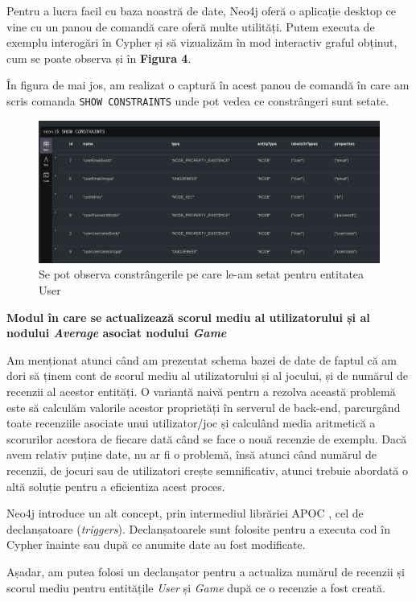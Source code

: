 \documentclass[12pt,a4paper]{report}
\begin{document}
Pentru a lucra facil cu baza noastră de date, Neo4j oferă o aplicație desktop ce vine cu un panou de comandă care oferă multe utilități. Putem executa de exemplu interogări în Cypher și să vizualizăm în mod interactiv graful obținut, cum se poate observa și în \textbf{Figura 4}.

În figura de mai jos, am realizat o captură în acest panou de comandă în care am scris comanda \texttt{SHOW CONSTRAINTS} unde pot vedea ce constrângeri sunt setate.

\begin{figure}[H]
\centering
\caption{}
\includegraphics[scale = 0.5]{exemplu_9_neo4j}
\caption*{Se pot observa constrângerile pe care le-am setat pentru entitatea User}
\end{figure}

\bigskip
\textbf{Modul în care se actualizează scorul mediu al utilizatorului și al nodului \emph{Average} asociat nodului \emph{Game}}
\bigskip

Am menționat atunci când am prezentat schema bazei de date de faptul că am dori să ținem cont de scorul mediu al utilizatorului și al jocului, și de numărul de recenzii al acestor entități. O variantă naivă pentru a rezolva această problemă este să calculăm valorile acestor proprietăți în serverul de back-end, parcurgând toate recenziile asociate unui utilizator/joc și calculând media aritmetică a scorurilor acestora de fiecare dată când se face o nouă recenzie de exemplu. Dacă avem relativ puține date, nu ar fi o problemă, însă atunci când numărul de recenzii, de jocuri sau de utilizatori crește semnificativ, atunci trebuie abordată o altă soluție pentru a eficientiza acest proces.

Neo4j introduce un alt concept, prin intermediul librăriei APOC \cite{13}, cel de declanșatoare
(\emph{triggers}). \cite{14}
Declanșatoarele sunt folosite pentru a executa cod în Cypher înainte sau după ce anumite date au fost modificate.

Așadar, am putea folosi un declanșator pentru a actualiza numărul de recenzii și scorul mediu pentru entitățile \emph{User} și \emph{Game} după ce o recenzie a fost creată.
\end{document}
